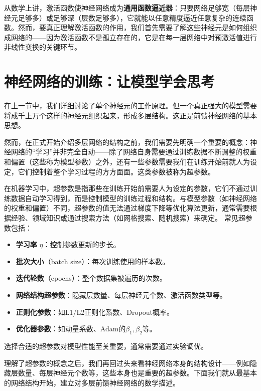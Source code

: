 \documentclass[lang=cn,zihao=-4,a4paper,fontset=windows]{beautybook}
\begin{document}
从数学上讲，激活函数使神经网络成为\textbf{通用函数逼近器}：只要网络足够宽（每层神经元足够多）或足够深（层数足够多），它就能以任意精度逼近任意复杂的连续函数。然而，要真正理解激活函数的作用，我们首先需要了解这些神经元是如何组织成网络的——因为激活函数不是孤立存在的，它是在每一层网络中对预激活值进行非线性变换的关键环节。

\section{神经网络的训练：让模型学会思考}

在上一节中，我们详细讨论了单个神经元的工作原理。但一个真正强大的模型需要将成千上万个这样的神经元组织起来，形成多层结构。这正是前馈神经网络的基本思想。

然而，在正式开始介绍多层网络的结构之前，我们需要先明确一个重要的概念：神经网络的“学习”并非完全自动——除了网络自身需要通过训练数据不断调整的权重和偏置（这些称为模型参数）之外，还有一些参数需要我们在训练开始前就人为设定，它们控制着整个学习过程的方方面面。这类参数被称为超参数。

\begin{definition}
在机器学习中，超参数是指那些在训练开始前需要人为设定的参数，它们不通过训练数据自动学习得到，而是控制模型的训练过程和结构。与模型参数（如神经网络的权重和偏置）不同，超参数的值无法通过梯度下降等优化算法更新，通常需要根据经验、领域知识或通过搜索方法（如网格搜索、随机搜索）来确定。
常见超参数包括：
\begin{itemize}
    \item \textbf{学习率} $\eta$：控制参数更新的步长。
    \item \textbf{批次大小}（batch size）：每次训练使用的样本数。
    \item \textbf{迭代轮数}（epochs）：整个数据集被遍历的次数。
    \item \textbf{网络结构超参数}：隐藏层数量、每层神经元个数、激活函数类型等。
    \item \textbf{正则化参数}：如L1/L2正则化系数、Dropout概率。
    \item \textbf{优化器参数}：如动量系数、Adam的$\beta_1,\beta_2$等。
\end{itemize}
选择合适的超参数对模型性能至关重要，通常需要通过实验调优。
\end{definition}

理解了超参数的概念之后，我们再回过头来看神经网络本身的结构设计——例如隐藏层数量、每层神经元个数等，这些本身也是重要的超参数。下面我们就从最基本的网络结构开始，建立对多层前馈神经网络的数学描述。
\end{document}
